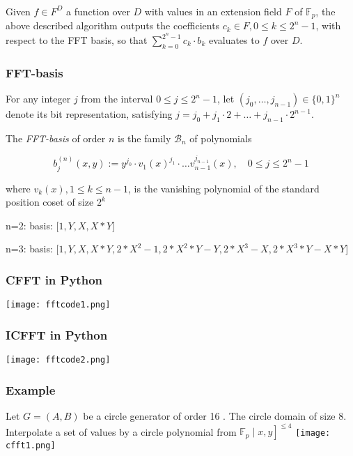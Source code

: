 \documentclass{beamer}
\begin{document}
\begin{frame}
	\frametitle{}
	\begin{theorem}
		Given $f \in F^D$ a function over $D$ with values in an extension field $F$ of $\mathbb{F}_p$, the above described algorithm outputs the coefficients $c_k \in F, 0 \leq k \leq 2^n-1$, with respect to the FFT basis, so that $\sum_{k=0}^{2^n-1} c_k \cdot b_k$ evaluates to $f$ over $D$.
	\end{theorem}

	
\end{frame}

\begin{frame}
	\frametitle{FFT-basis}
	\begin{definition}
		For any integer $j$ from the interval $0 \leq j \leq 2^n-1$, let $\left(j_0, \ldots, j_{n-1}\right) \in\{0,1\}^n$ denote its bit representation, satisfying $j=j_0+j_1 \cdot 2+\ldots+j_{n-1} \cdot 2^{n-1}$. 
		
	The \emph{FFT-basis} of order $n$ is the family $\mathcal{B}_n$ of polynomials

$$
b_j^{(n)}(x, y):=y^{j_0} \cdot v_1(x)^{j_1} \cdot \ldots v_{n-1}^{j_{n-1}}(x), \quad 0 \leq j \leq 2^n-1
$$

where $v_k(x), 1 \leq k \leq n-1$, is the vanishing polynomial of the standard position coset of size $2^k$
	\end{definition}
	
n=2:
basis: [$1, Y, X, X*Y$]
  
  n=3:
  basis: [$1, Y, X, X*Y, 2*X^2 - 1, 2*X^2*Y - Y, 2*X^3 - X, 2*X^3*Y - X*Y$]
  
\end{frame}

\begin{frame}
	\frametitle{CFFT in Python}
	\texttt{[image: fftcode1.png]}
\end{frame}

\begin{frame}
	\frametitle{ICFFT in Python}
	\texttt{[image: fftcode2.png]}
\end{frame}


\begin{frame}
	\frametitle{Example}
	Let $G=(A, B)$ be a circle generator of order 16 . The circle domain of size 8. Interpolate a set of values by a circle polynomial from $\left.\mathbb{F}_p \mid x, y\right]^{\leq 4}$
	\texttt{[image: cfft1.png]}
\end{frame}
\end{document}
